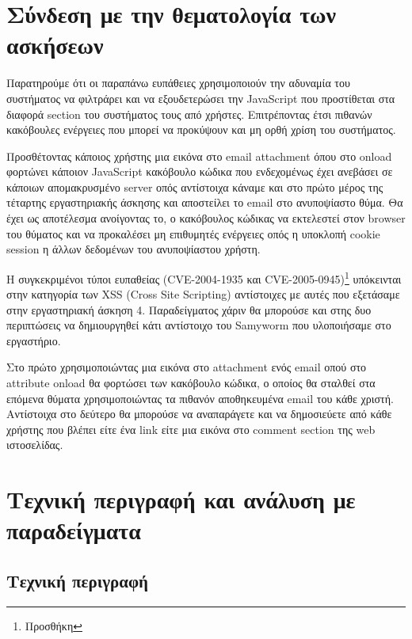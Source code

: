 %
%

\setcounter{section}{1}
\section{Σύνδεση με την θεματολογία των ασκήσεων}

\noindent
Παρατηρούμε ότι οι παραπάνω ευπάθειες χρησιμοποιούν την αδυναμία του συστήματος να φιλτράρει και να εξουδετερώσει την JavaScript που προστίθεται στα διαφορά section του συστήματος τους από χρήστες. Επιτρέποντας έτσι πιθανών κακόβουλες ενέργειες που μπορεί να προκύψουν και μη ορθή χρίση του συστήματος. 

\noindent
Προσθέτοντας κάποιος χρήστης μια εικόνα στο email attachment όπου στο onload φορτώνει κάποιον JavaScript κακόβουλο κώδικα που ενδεχομένως έχει ανεβάσει σε κάποιων απομακρυσμένο server οπός αντίστοιχα κάναμε και στο πρώτο μέρος της τέταρτης εργαστηριακής άσκησης και αποστείλει το email στο ανυποψίαστο θύμα. Θα έχει ως αποτέλεσμα ανοίγοντας το, ο κακόβουλος κώδικας να εκτελεστεί στον browser του θύματος και να προκαλέσει μη επιθυμητές ενέργειες οπός η υποκλοπή cookie session η άλλων δεδομένων του ανυποψίαστου χρήστη. 

\noindent
Η συγκεκριμένοι τύποι ευπαθείας (CVE-2004-1935 και CVE-2005-0945)\footnote{Προσθήκη} υπόκεινται στην κατηγορία των XSS (Cross Site Scripting) αντίστοιχες με αυτές που εξετάσαμε στην εργαστηριακή άσκηση 4. Παραδείγματος χάριν θα μπορούσε και στης δυο περιπτώσεις να δημιουργηθεί κάτι αντίστοιχο του Samyworm που υλοποιήσαμε στο εργαστήριο. 

\noindent
Στο πρώτο χρησιμοποιώντας μια εικόνα στο attachment ενός email οπού στο attribute onload θα φορτώσει των κακόβουλο κώδικα, ο οποίος θα σταλθεί στα επόμενα θύματα χρησιμοποιώντας τα πιθανόν αποθηκευμένα email του κάθε χριστή. Αντίστοιχα στο δεύτερο θα μπορούσε να αναπαράγετε και να δημοσιεύετε από κάθε χρήστης που βλέπει είτε ένα link είτε μια εικόνα στο comment section της web ιστοσελίδας. 




\section{Τεχνική περιγραφή και ανάλυση με παραδείγματα}

\subsection{Τεχνική περιγραφή}

